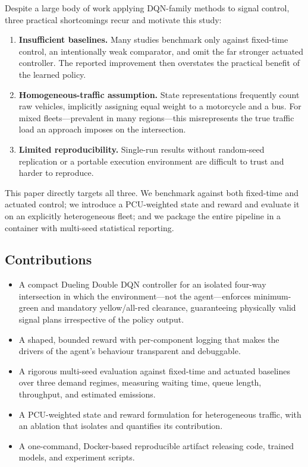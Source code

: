 \documentclass[conference]{IEEEtran}
\begin{document}
Despite a large body of work applying DQN-family methods to signal control,
three practical shortcomings recur and motivate this study:
\begin{enumerate}
\item \textbf{Insufficient baselines.} Many studies benchmark only against
fixed-time control, an intentionally weak comparator, and omit the far stronger
actuated controller. The reported improvement then overstates the practical
benefit of the learned policy.
\item \textbf{Homogeneous-traffic assumption.} State representations frequently
count raw vehicles, implicitly assigning equal weight to a motorcycle and a bus.
For mixed fleets---prevalent in many regions---this misrepresents the true
traffic load an approach imposes on the intersection.
\item \textbf{Limited reproducibility.} Single-run results without random-seed
replication or a portable execution environment are difficult to trust and
harder to reproduce.
\end{enumerate}

This paper directly targets all three. We benchmark against both fixed-time and
actuated control; we introduce a PCU-weighted state and reward and evaluate it on
an explicitly heterogeneous fleet; and we package the entire pipeline in a
container with multi-seed statistical reporting.

\subsection{Contributions}
\begin{itemize}
\item A compact Dueling Double DQN controller for an isolated four-way
intersection in which the environment---not the agent---enforces minimum-green
and mandatory yellow/all-red clearance, guaranteeing physically valid signal
plans irrespective of the policy output.
\item A shaped, bounded reward with per-component logging that makes the drivers
of the agent's behaviour transparent and debuggable.
\item A rigorous multi-seed evaluation against fixed-time and actuated baselines
over three demand regimes, measuring waiting time, queue length, throughput, and
estimated emissions.
\item A PCU-weighted state and reward formulation for heterogeneous traffic, with
an ablation that isolates and quantifies its contribution.
\item A one-command, Docker-based reproducible artifact releasing code, trained
models, and experiment scripts.
\end{itemize}
\end{document}
